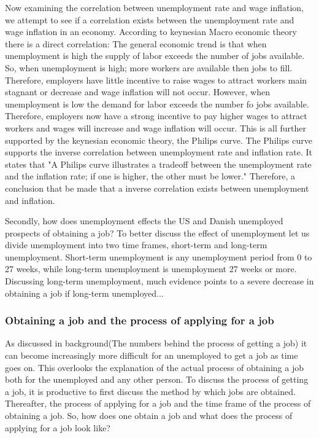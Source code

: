 Now examining the correlation between unemployment rate and wage inflation, we attempt to see if a correlation exists between the unemployment rate and wage inflation in an economy.
According to keynesian Macro economic theory there is a direct correlation:
The general economic trend is that when unemployment is high the supply of labor exceeds the number of jobs available.
So, when unemployment is high; more workers are available then jobs to fill.
Therefore, employers have little incentive to raise wages to attract workers main stagnant or decrease and wage inflation will not occur.
However, when unemployment is low the demand for labor exceeds the number fo jobs available. 
Therefore, employers now have a strong incentive to pay higher wages to attract workers and wages will increase and wage inflation will occur.\cite{Economics_Unemployment_Inflation}
This is all further supported by the keynesian economic theory, the Philips curve.
The Philips curve supports the inverse correlation between unemployment rate and inflation rate.
It states that "A Philips curve illustrates a tradeoff between the unemployment rate and the inflation rate; if one is higher, the other must be lower." \cite{Economics_Philips_Curve}
Therefore, a conclusion that be made that a inverse correlation exists between unemployment and inflation.

Secondly, how does unemployment effects the US and Danish unemployed prospects of obtaining a job?
To better discuss the effect of unemployment let us divide unemployment into two time frames, short-term and long-term unemployment.
Short-term unemployment is any unemployment period from 0 to 27 weeks, while long-term unemployment is unemployment 27 weeks or more.
Discussing long-term unemployment, much evidence points to a severe decrease in obtaining a job if long-term unemployed...

\subsubsection{Obtaining a job and the process of applying for a job}
As discussed in background(The numbers behind the process of getting a job) it can become increasingly more difficult for an unemployed to get a job as time goes on.
This overlooks the explanation of the actual process of obtaining a job both for the unemployed and any other person.
To discuss the process of getting a job, it is productive to first discuss the method by which jobs are obtained.
Thereafter, the process of applying for a job and the time frame of the process of obtaining a job.
So, how does one obtain a job and what does the process of applying for a job look like?

